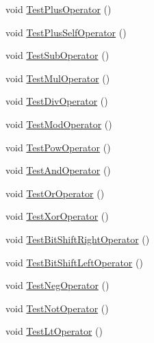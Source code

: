 \begin{DoxyCompactItemize}
\item 
void \mbox{\hyperlink{classkhiva_1_1array_1_1tests_1_1_array_tests_a3df6eafff48e26ae1cde52cf3b4ffd7f}{Test\+Plus\+Operator}} ()
\item 
void \mbox{\hyperlink{classkhiva_1_1array_1_1tests_1_1_array_tests_a3389bec5f2694e9a7346ed10d26a2304}{Test\+Plus\+Self\+Operator}} ()
\item 
void \mbox{\hyperlink{classkhiva_1_1array_1_1tests_1_1_array_tests_a3b4f171c3619e4b1d7ef4b307d31c2ee}{Test\+Sub\+Operator}} ()
\item 
void \mbox{\hyperlink{classkhiva_1_1array_1_1tests_1_1_array_tests_a145e2f65560a47238fafbb219dbd0eda}{Test\+Mul\+Operator}} ()
\item 
void \mbox{\hyperlink{classkhiva_1_1array_1_1tests_1_1_array_tests_a11f32f49550620902a8e0fceb9295173}{Test\+Div\+Operator}} ()
\item 
void \mbox{\hyperlink{classkhiva_1_1array_1_1tests_1_1_array_tests_aa3e1498fb7b9eb32190682258e003931}{Test\+Mod\+Operator}} ()
\item 
void \mbox{\hyperlink{classkhiva_1_1array_1_1tests_1_1_array_tests_a03f01fdca6ce138a8a788667094e51bb}{Test\+Pow\+Operator}} ()
\item 
void \mbox{\hyperlink{classkhiva_1_1array_1_1tests_1_1_array_tests_a282db60866fd7b60ecb7ccde2be3a6c1}{Test\+And\+Operator}} ()
\item 
void \mbox{\hyperlink{classkhiva_1_1array_1_1tests_1_1_array_tests_ab2d0b42f4044cdbdf5b3ce5c64fd2d05}{Test\+Or\+Operator}} ()
\item 
void \mbox{\hyperlink{classkhiva_1_1array_1_1tests_1_1_array_tests_a04601c645a5f859378a6e5e01969ce9d}{Test\+Xor\+Operator}} ()
\item 
void \mbox{\hyperlink{classkhiva_1_1array_1_1tests_1_1_array_tests_a81185865311f397d298cc751fb907cc8}{Test\+Bit\+Shift\+Right\+Operator}} ()
\item 
void \mbox{\hyperlink{classkhiva_1_1array_1_1tests_1_1_array_tests_a7a6c478ff7876620f2a5bdef5d968efe}{Test\+Bit\+Shift\+Left\+Operator}} ()
\item 
void \mbox{\hyperlink{classkhiva_1_1array_1_1tests_1_1_array_tests_ab8b4adf01774507ab1f52880c3380eba}{Test\+Neg\+Operator}} ()
\item 
void \mbox{\hyperlink{classkhiva_1_1array_1_1tests_1_1_array_tests_ab9072eb101d5239280299f9452d1b1e9}{Test\+Not\+Operator}} ()
\item 
void \mbox{\hyperlink{classkhiva_1_1array_1_1tests_1_1_array_tests_af39b93fb45cf292126b464512aef0580}{Test\+Lt\+Operator}} ()

\end{DoxyCompactItemize}
